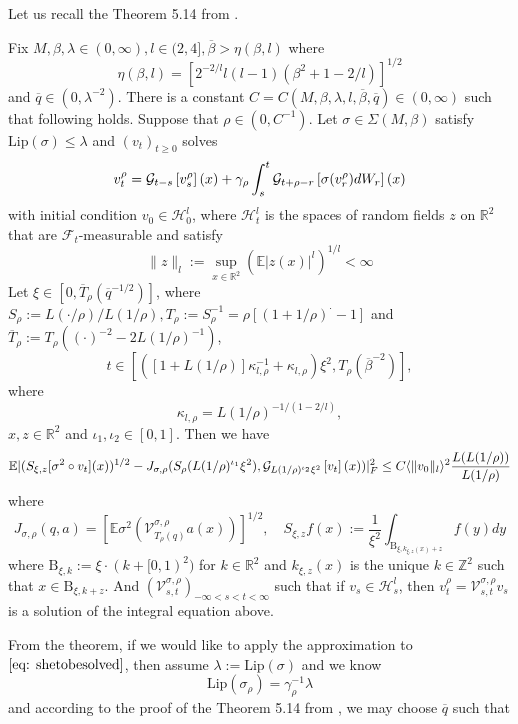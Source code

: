 Let us recall the Theorem 5.14 from \cite{dunlap2026renormalizationflow2dnonlinear}.

\begin{theorem}
    Fix $M,\beta,\lambda \in (0,\infty), l\in(2,4], \overline{\beta} > \eta(\beta,l)$ where
    \[
    \eta(\beta,l) = [2^{-2/l}l(l-1)(\beta^2+1-2/l)]^{1/2}
    \]
    and $\overline{q} \in (0,\lambda^{-2})$. There is a constant $C = C(M,\beta,\lambda,l,\overline{\beta},\overline{q})\in (0,\infty)$ such that following holds. Suppose that $\rho \in (0,C^{-1})$. Let $\sigma \in \Sigma(M,\beta)$ satisfy $\text{Lip}(\sigma) \leq \lambda$ and $(v_t)_{t\geq 0}$ solves
    \[
    v_t^{\rho} = \mathcal{G}_{t-s}\left[{v_s^{\rho}}\right](x) + \gamma_{\rho}\int_s^t \mathcal{G}_{t+\rho-r}\left[{\sigma(v_r^{\rho})dW_r}\right](x)
    \]
    with initial condition $v_0 \in \mathscr{H}_0^l$, where $\mathscr{H}_t^l$ is the spaces of random fields $z$ on $\mathbb{R}^2$ that are $\mathcal{F}_t$-measurable and satisfy
    \[\lVert z\rVert_l := \sup_{x\in\mathbb{R}^2}(\mathbb{E}|z(x)|^l)^{1/l} < \infty\]
    Let $\xi \in [0,\overline{T}_{\rho}(\overline{q}^{-1/2})]$, where $S_{\rho}:=L(\cdot/\rho)/L(1/\rho),T_\rho := S_{\rho}^{-1} =\rho[(1+1/\rho)^{\cdot}-1]$ and $\overline{T}_{\rho}:=T_{\rho}((\cdot)^{-2}-2L(1/\rho)^{-1})$,
    \[t\in [([1+L(1/\rho)]\kappa_{l,\rho}^{-1}+\kappa_{l,\rho})\xi^2,T_{\rho}(\overline{\beta}^{-2})],\]
    where
    \[\kappa_{l,\rho} = L(1/\rho)^{-1/(1-2/l)},\]
    $x,z \in\mathbb{R}^2$ and $\iota_1,\iota_2\in[0,1]$. Then we have
    \[\mathbb{E}\lvert(S_{\xi,z}[\sigma^2\circ v_t](x))^{1/2}-J_{\sigma,\rho}(S_{\rho}(L(1/\rho)^{\iota_1}\xi^2),\mathcal{G}_{L(1/\rho)^{\iota_2}\xi^2}\left[{v_t}\right](x))\rvert_F^2 \leq C\langle\lVert v_0\rVert_l\rangle^2\dfrac{L(L(1/\rho))}{L(1/\rho)}
    \]
    where 
    \[
    J_{\sigma,\rho}(q,a) = [\mathbb{E}\sigma^2(\mathcal{V}^{\sigma,\rho}_{T_{\rho}(q)}a(x))]^{1/2},\quad S_{\xi,z}f(x) := \dfrac{1}{\xi^2} \int_{\text{B}_{\xi,k_{\xi,z}(x)+z}}f(y)dy
    \]
    where $\text{B}_{\xi,k} := \xi\cdot(k+[0,1)^2)$ for $k\in\mathbb{R}^2$ and $k_{\xi,z}(x)$ is the unique $k\in\mathbb{Z}^2$ such that $x\in \text{B}_{\xi,k+z}$. And $(\mathcal{V}^{\sigma,\rho}_{s,t})_{-\infty < s < t < \infty}$ such that if $v_s \in \mathscr{H}_s^l$, then $v_t^{\rho} = \mathcal{V}^{\sigma,\rho}_{s,t}v_s$ is a solution of the integral equation above.
\end{theorem}
From the theorem, if we would like to apply the approximation to $\eqref{eq: shetobesolved}$, then assume $\lambda:=\text{Lip}(\sigma)$ and we know
\[
\text{Lip}
(\sigma_{\rho}) = \gamma_{\rho}^{-1}\lambda\]
and according to the proof of the Theorem 5.14 from \cite{dunlap2026renormalizationflow2dnonlinear}, we may choose $\overline{q}$ such that
